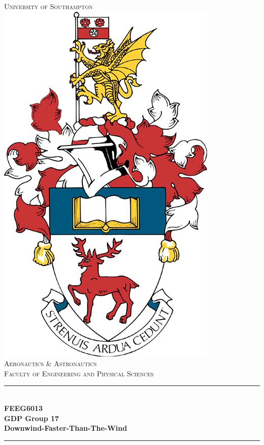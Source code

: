 \begin{center}

\newcommand{\HRule}{\rule{\linewidth}{0.5mm}} %

\center %

\textsc{\LARGE University of Southampton}\\[7mm] %
\includegraphics[scale=.4]{images/crest.jpg}\\[0.5cm] %
\textsc{\Large Aeronautics \& Astronautics}\\[0.15cm] %
\textsc{\large Faculty of Engineering and Physical Sciences}\\[0.2cm] %

\HRule \\[4mm]
{ \huge \bfseries FEEG6013}\\[0.4cm]
{ \huge \bfseries GDP Group 17}\\[0.4cm]
{ \huge \bfseries Downwind-Faster-Than-The-Wind}\\[0.4cm]
\HRule \\[2 cm]


\end{center}
